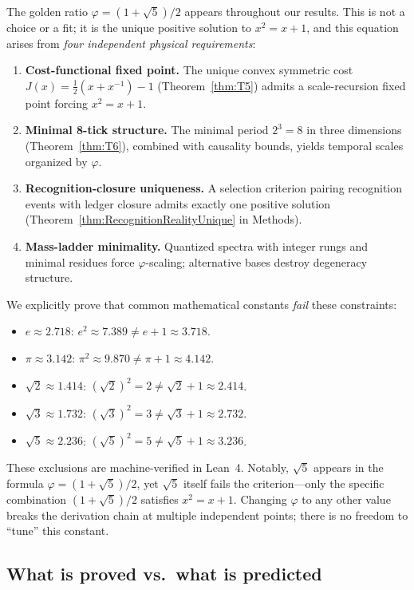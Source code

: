 \documentclass[11pt]{article}
\begin{document}
The golden ratio $\varphi=(1+\sqrt{5})/2$ appears throughout our results. This is not a choice or a fit; it is the unique positive solution to $x^2=x+1$, and this equation arises from \emph{four independent physical requirements}:
\begin{enumerate}
\item \textbf{Cost-functional fixed point.} The unique convex symmetric cost $J(x)=\tfrac{1}{2}(x+x^{-1})-1$ (Theorem~\ref{thm:T5}) admits a scale-recursion fixed point forcing $x^2=x+1$.
\item \textbf{Minimal 8-tick structure.} The minimal period $2^3=8$ in three dimensions (Theorem~\ref{thm:T6}), combined with causality bounds, yields temporal scales organized by $\varphi$.
\item \textbf{Recognition-closure uniqueness.} A selection criterion pairing recognition events with ledger closure admits exactly one positive solution (Theorem~\ref{thm:RecognitionRealityUnique} in Methods).
\item \textbf{Mass-ladder minimality.} Quantized spectra with integer rungs and minimal residues force $\varphi$-scaling; alternative bases destroy degeneracy structure.
\end{enumerate}
We explicitly prove that common mathematical constants \emph{fail} these constraints:
\begin{itemize}
\item $e\approx 2.718$: $e^2\approx 7.389 \ne e+1\approx 3.718$.
\item $\pi\approx 3.142$: $\pi^2\approx 9.870 \ne \pi+1\approx 4.142$.
\item $\sqrt{2}\approx 1.414$: $(\sqrt{2})^2=2 \ne \sqrt{2}+1\approx 2.414$.
\item $\sqrt{3}\approx 1.732$: $(\sqrt{3})^2=3 \ne \sqrt{3}+1\approx 2.732$.
\item $\sqrt{5}\approx 2.236$: $(\sqrt{5})^2=5 \ne \sqrt{5}+1\approx 3.236$.
\end{itemize}
These exclusions are machine-verified in Lean~4. Notably, $\sqrt{5}$ appears in the formula $\varphi=(1+\sqrt{5})/2$, yet $\sqrt{5}$ itself fails the criterion---only the specific combination $(1+\sqrt{5})/2$ satisfies $x^2=x+1$. Changing $\varphi$ to any other value breaks the derivation chain at multiple independent points; there is no freedom to ``tune'' this constant.

\subsection*{What is proved vs.\ what is predicted}
\end{document}
